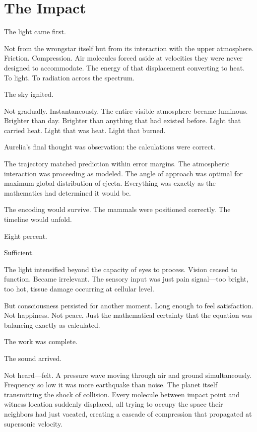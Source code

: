 \chapter{The Impact}
\label{ch:15}


The light came first.

Not from the wrongstar itself but from its interaction with the upper atmosphere. Friction. Compression. Air molecules forced aside at velocities they were never designed to accommodate. The energy of that displacement converting to heat. To light. To radiation across the spectrum.

The sky ignited.

Not gradually. Instantaneously. The entire visible atmosphere became luminous. Brighter than day. Brighter than anything that had existed before. Light that carried heat. Light that was heat. Light that burned.

Aurelia's final thought was observation: the calculations were correct.

The trajectory matched prediction within error margins. The atmospheric interaction was proceeding as modeled. The angle of approach was optimal for maximum global distribution of ejecta. Everything was exactly as the mathematics had determined it would be.

The encoding would survive. The mammals were positioned correctly. The timeline would unfold.

Eight percent.

Sufficient.

The light intensified beyond the capacity of eyes to process. Vision ceased to function. Became irrelevant. The sensory input was just pain signal—too bright, too hot, tissue damage occurring at cellular level.

But consciousness persisted for another moment. Long enough to feel satisfaction. Not happiness. Not peace. Just the mathematical certainty that the equation was balancing exactly as calculated.

The work was complete.

\scenebreak

The sound arrived.

Not heard—felt. A pressure wave moving through air and ground simultaneously. Frequency so low it was more earthquake than noise. The planet itself transmitting the shock of collision. Every molecule between impact point and witness location suddenly displaced, all trying to occupy the space their neighbors had just vacated, creating a cascade of compression that propagated at supersonic velocity.

